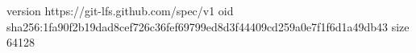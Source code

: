 version https://git-lfs.github.com/spec/v1
oid sha256:1fa90f2b19dad8cef726c36fef69799ed8d3f44409cd259a0e7f1f6d1a49db43
size 64128
